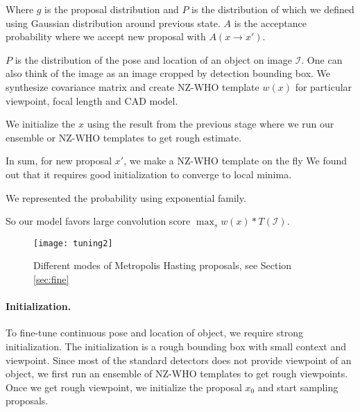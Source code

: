 Where $g$ is the proposal distribution and $P$ is the distribution of which we
defined using Gaussian distribution around previous state. $A$ is the
acceptance probability where we accept new proposal with $A(x \rightarrow x')$.


$P$ is the distribution of the pose and location of an object on image
$\mathcal{I}$. One can also think of the image as an image cropped by detection
bounding box. We synthesize covariance matrix and create NZ-WHO template $w(x)$ for particular viewpoint, focal length and CAD model.

We initialize the $x$ using the result from the previous stage where we run our ensemble or NZ-WHO templates to get rough estimate.

In sum, for new proposal $x'$, we make a NZ-WHO template on the fly 
We found out that it requires good initialization to converge to local minima. 

We represented the probability using exponential family. 

So our model favors large convolution score $\max_{s} w(x) \ast T(\mathcal{I})$. 
\begin{figure}[t]
\centering
    \texttt{[image: tuning2]} \\ [-5pt]
    \caption{Different modes of Metropolis Hasting proposals, see Section \ref{sec:fine}}
 \label{fig:tuningmode}
\end{figure}


\paragraph{Initialization.}
To fine-tune continuous pose and location of object, we require strong
initialization. The initialization is a rough bounding box with small context
and viewpoint. Since most of the standard detectors does not provide viewpoint
of an object, we first run an ensemble of NZ-WHO templates to get rough
viewpoints. Once we get rough viewpoint, we initialize the proposal $x_0$ and
start sampling proposals.
